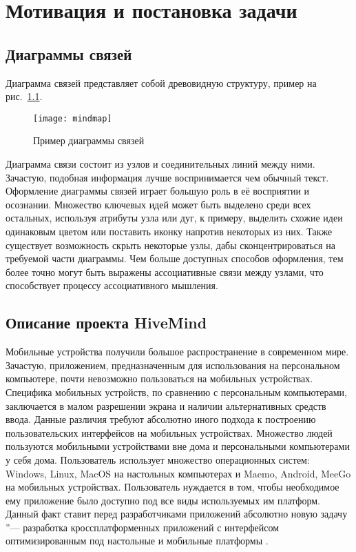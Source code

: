 \newpage

\chapter{Мотивация и постановка задачи}
\label{ch:chapter_1}

\section{Диаграммы связей}
\label{sec:mindmaps}
Диаграмма связей представляет собой древовидную структуру, пример на
рис.~\ref{pic:mindmap}.

\begin{figure}[h!]
  \centering
  \texttt{[image: mindmap]}
  \caption{Пример диаграммы связей}
  \label{pic:mindmap}
\end{figure}

Диаграмма связи состоит из узлов и соединительных линий между ними. Зачастую,
подобная информация лучше воспринимается чем обычный текст. Оформление диаграммы
связей играет большую роль в её восприятии и осознании. Множество ключевых идей
может быть выделено среди всех остальных, используя атрибуты узла или дуг, к
примеру, выделить схожие идеи одинаковым цветом или поставить иконку напротив
некоторых из них. Также существует возможность скрыть некоторые узлы, дабы
сконцентрироваться на требуемой части диаграммы. Чем больше доступных
способов оформления, тем более точно могут быть выражены ассоциативные связи
между узлами, что способствует процессу ассоциативного мышления.


\section{Описание проекта HiveMind}
\label{sec:project_summary}
Мобильные устройства получили большое распространение в современном мире.
Зачастую, приложением, предназначенным для использования на персональном
компьютере, почти невозможно пользоваться на мобильных устройствах. Специфика
мобильных устройств, по сравнению с персональным компьютерами, заключается в
малом разрешении экрана и наличии альтернативных средств ввода. Данные различия
требуют абсолютно иного подхода к построению пользовательских интерфейсов на
мобильных устройствах. Множество людей пользуются мобильными устройствами вне
дома и персональными компьютерами у себя дома. Пользователь использует множество
операционных систем: Windows, Linux, MacOS на настольных компьютерах и Maemo,
Android, MeeGo на мобильных устройствах. Пользователь нуждается в том, чтобы
необходимое ему приложение было доступно под все виды используемых им платформ.
Данный факт ставит перед разработчиками приложений абсолютно новую задачу  ''---
разработка кроссплатформенных приложений с интерфейсом оптимизированным под
настольные и мобильные платформы \cite{hivemind-8th-fruct}.

